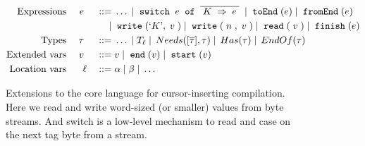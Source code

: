 
\begin{figure}
  \vspace{-5mm}
  \begin{displaymath}
    \begin{aligned}
      \textup{Expressions} && \; {e} \; && 
     \; ::= \; & \ldots \; | \; \; \texttt{switch} \;{}\; e\; \; \texttt{of} \;\; \overline{{\; {K} \;} \Rightarrow {\; {e} \;}} \; 
     \; | \;  \; \texttt{toEnd} \;(e)
     \; | \;  \; \texttt{fromEnd} \;(e)
     \\     
     && && \; | \; & \; \texttt{write} \;(`K\textrm',\; v \;)
           \; | \; \; \texttt{write} \;(\; n \;,\; v \;)
           \; | \; \; \texttt{read} \;(\; v \;) \; | \; 
      \; \texttt{finish} \;(e) \\      
      \textup{Types} && \; {\tau} \; && \; ::= \; & \ldots 
               \; | \; T_{\ell}
               \; | \; \, Needs([\overline{\tau}],\tau) \; | \; \, Has(\tau) 
               \; | \; \, EndOf(\tau) \\
      \textup{Extended vars} && \; v \; && \; ::= \; & 
           v \; | \; \; \texttt{end} \;(v) 
                \; | \; \; \texttt{start} \;(v) \\
      \textup{Location vars} && \ell && \; ::= \; & \alpha \; | \; \beta \; | \; \ldots \\
    \end{aligned}
  \end{displaymath}
  \vspace{-4mm}
  \caption{Extensions to the core language for cursor-inserting compilation.
    Here we read and write word-sized (or smaller) values from byte streams. And
    switch is a low-level mechanism to read and case on the next tag byte from a
    stream.}
  \label{fig:target}
\end{figure}
